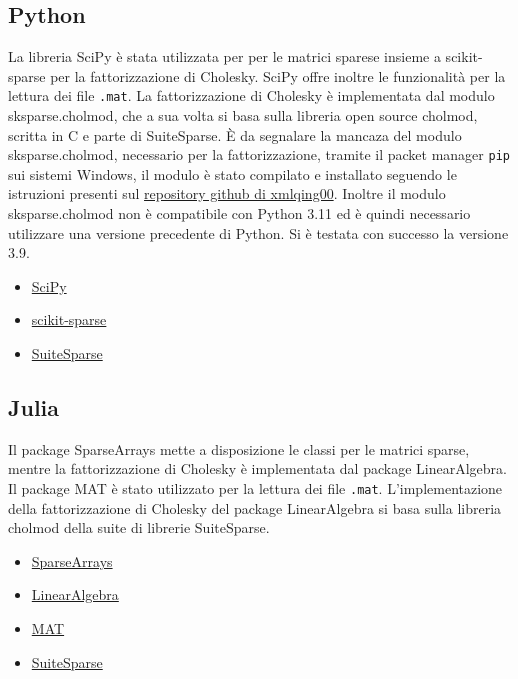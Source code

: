 \documentclass[a4paper, 12pt]{article}
\begin{document}
\subsection{Python}
La libreria SciPy è stata utilizzata per per le matrici sparese insieme a
scikit-sparse per la fattorizzazione di Cholesky.
SciPy offre inoltre le funzionalità per la lettura dei file \texttt{.mat}.
La fattorizzazione di Cholesky è implementata dal modulo sksparse.cholmod,
che a sua volta si basa sulla libreria open source cholmod, scritta in C e
parte di SuiteSparse.
\`E da segnalare la mancaza del modulo sksparse.cholmod, necessario per la
fattorizzazione, tramite il packet manager \texttt{pip} sui sistemi Windows,
il modulo è stato compilato e installato seguendo le istruzioni presenti sul
\href{https://github.com/xmlyqing00/Cholmod-Scikit-Sparse-Windows}
{repository github di xmlqing00}.
Inoltre il modulo sksparse.cholmod non è compatibile con Python 3.11
ed è quindi necessario utilizzare una versione precedente di Python. Si è
testata con successo la versione 3.9.

\begin{itemize}
\item \href{https://www.scipy.org/}{SciPy}
\item \href{https://github.com/scikit-sparse/scikit-sparse} {scikit-sparse}
\item \href{http://suitesparse.com}{SuiteSparse}
\end{itemize}

\subsection{Julia}
Il package SparseArrays mette a disposizione le classi per le matrici sparse,
mentre la fattorizzazione di Cholesky è implementata dal package LinearAlgebra.
Il package MAT è stato utilizzato per la lettura dei file \texttt{.mat}.
L'implementazione della fattorizzazione di Cholesky del package LinearAlgebra
si basa sulla libreria cholmod della suite di librerie SuiteSparse.

\begin{itemize}
\item \href{https://docs.julialang.org/en/v1/stdlib/SparseArrays/}{SparseArrays}
\item \href{https://docs.julialang.org/en/v1/stdlib/LinearAlgebra/}
{LinearAlgebra}
\item \href{https://github.com/JuliaIO/MAT.jl}{MAT}
\item \href{http://suitesparse.com}{SuiteSparse}
\end{itemize}
\end{document}
